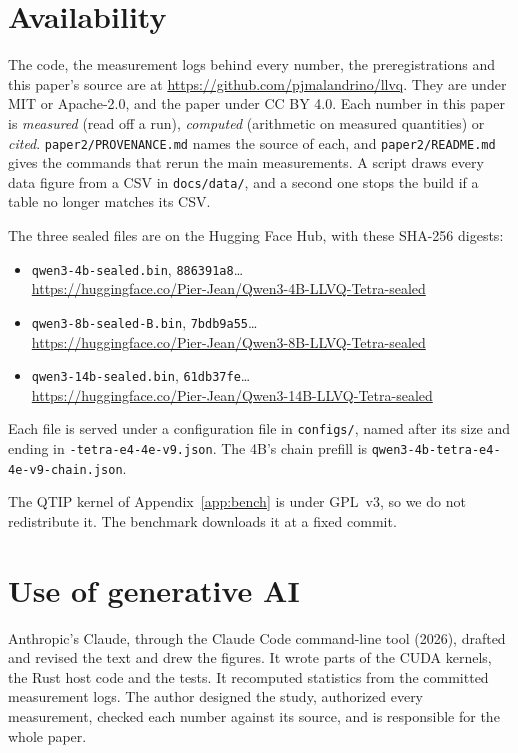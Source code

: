 \section*{Availability}

The code, the measurement logs behind every number, the preregistrations and
this paper's source are at \url{https://github.com/pjmalandrino/llvq}. They
are under MIT or Apache-2.0, and the paper under CC BY 4.0. Each number in
this paper is \emph{measured} (read off a run), \emph{computed} (arithmetic on
measured quantities) or \emph{cited}. \mbox{\nolinkurl{paper2/PROVENANCE.md}}
names the source of each, and \mbox{\nolinkurl{paper2/README.md}} gives the
commands that rerun the main measurements. A script draws every data figure
from a CSV in \texttt{docs/data/}, and a second one stops the build if a table
no longer matches its CSV.

The three sealed files are on the Hugging Face Hub, with these SHA-256 digests:
\begin{itemize}
\item \nolinkurl{qwen3-4b-sealed.bin}, \texttt{886391a8}\ldots\\
  \url{https://huggingface.co/Pier-Jean/Qwen3-4B-LLVQ-Tetra-sealed}
\item \nolinkurl{qwen3-8b-sealed-B.bin}, \texttt{7bdb9a55}\ldots\\
  \url{https://huggingface.co/Pier-Jean/Qwen3-8B-LLVQ-Tetra-sealed}
\item \nolinkurl{qwen3-14b-sealed.bin}, \texttt{61db37fe}\ldots\\
  \url{https://huggingface.co/Pier-Jean/Qwen3-14B-LLVQ-Tetra-sealed}
\end{itemize}

Each file is served under a configuration file in \texttt{configs/}, named
after its size and ending in \texttt{-tetra-e4-4e-v9.json}. The 4B's chain
prefill is \nolinkurl{qwen3-4b-tetra-e4-4e-v9-chain.json}.

The QTIP kernel of Appendix~\ref{app:bench} is under GPL~v3, so we do not
redistribute it. The benchmark downloads it at a fixed commit.

\section*{Use of generative AI}

Anthropic's Claude, through the Claude Code command-line tool (2026), drafted
and revised the text and drew the figures. It wrote parts of the CUDA kernels,
the Rust host code and the tests. It recomputed statistics from the committed
measurement logs. The author designed the study, authorized every
measurement, checked each number against its source, and is responsible for
the whole paper.
